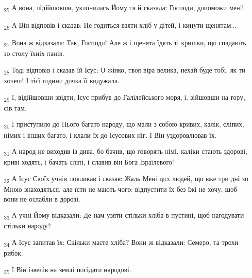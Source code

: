 \begin{tcolorbox}
\textsubscript{25} А вона, підійшовши, уклонилась Йому та й сказала: Господи, допоможи мені!
\end{tcolorbox}
\begin{tcolorbox}
\textsubscript{26} А Він відповів і сказав: Не годиться взяти хліб у дітей, і кинути щенятам...
\end{tcolorbox}
\begin{tcolorbox}
\textsubscript{27} Вона ж відказала: Так, Господи! Але ж і щенята їдять ті кришки, що спадають зо столу їхніх панів.
\end{tcolorbox}
\begin{tcolorbox}
\textsubscript{28} Тоді відповів і сказав їй Ісус: О жінко, твоя віра велика, нехай буде тобі, як ти хочеш! І тієї години дочка її видужала.
\end{tcolorbox}
\begin{tcolorbox}
\textsubscript{29} І, відійшовши звідти, Ісус прибув до Галілейського моря, і, зійшовши на гору, сів там.
\end{tcolorbox}
\begin{tcolorbox}
\textsubscript{30} І приступило до Нього багато народу, що мали з собою кривих, калік, сліпих, німих і інших багато, і клали їх до Ісусових ніг. І Він уздоровлював їх.
\end{tcolorbox}
\begin{tcolorbox}
\textsubscript{31} А народ не виходив із дива, бо бачив, що говорять німі, каліки стають здорові, криві ходять, і бачать сліпі, і славив він Бога Ізраїлевого!
\end{tcolorbox}
\begin{tcolorbox}
\textsubscript{32} А Ісус Своїх учнів покликав і сказав: Жаль Мені цих людей, що вже три дні зо Мною знаходяться, але їсти не мають чого; відпустити їх без їжі не хочу, щоб вони не ослабли в дорозі.
\end{tcolorbox}
\begin{tcolorbox}
\textsubscript{33} А учні Йому відказали: Де нам узяти стільки хліба в пустині, щоб нагодувати стільки народу?
\end{tcolorbox}
\begin{tcolorbox}
\textsubscript{34} А Ісус запитав їх: Скільки маєте хліба? Вони ж відказали: Семеро, та трохи рибок.
\end{tcolorbox}
\begin{tcolorbox}
\textsubscript{35} І Він ізвелів на землі посідати народові.
\end{tcolorbox}
